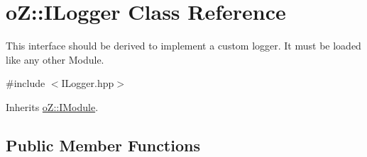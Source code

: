 \hypertarget{classo_z_1_1_i_logger}{}\section{oZ\+::I\+Logger Class Reference}
\label{classo_z_1_1_i_logger}


This interface should be derived to implement a custom logger. It must be loaded like any other Module.  




{\ttfamily \#include $<$I\+Logger.\+hpp$>$}



Inherits \mbox{\hyperlink{classo_z_1_1_i_module}{o\+Z\+::\+I\+Module}}.

\subsection*{Public Member Functions}
